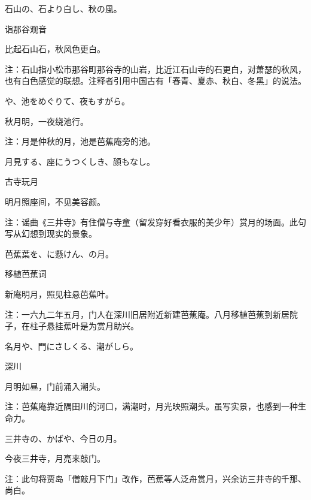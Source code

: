 \begin{haiku}
    {\FH 石山の、石より白し、秋の風。}

    {\FK 诣那谷观音}

    {\FK 比起石山石，秋风色更白。}

    {\FT 注：石山指小松市那谷町那谷寺的山岩，比近江石山寺的石更白，对萧瑟的秋风，也有白色感觉的联想。注释者引用中国古有「春青、夏赤、秋白、冬黑」的说法。}
\end{haiku}

\begin{haiku}
    {\FH {}や、池をめぐりて、夜もすがら。}

    {\FK 秋月明，一夜绕池行。}

    {\FT 注：月是仲秋的月，池是芭蕉庵旁的池。}
\end{haiku}

\begin{haiku}
    {\FH 月見する、座にうつくしき、顔もなし。}

    {\FK 古寺玩月}

    {\FK 明月照座间，不见美容颜。}

    {\FT 注：谣曲《三井寺》有住僧与寺童（留发穿好看衣服的美少年）赏月的场面。此句写从幻想到现实的景象。}
\end{haiku}

\begin{haiku}
    {\FH 芭蕉葉を、に懸けん、の月。}

    {\FK 移植芭蕉词}

    {\FK 新庵明月，照见柱悬芭蕉叶。}

    {\FT 注：一六九二年五月，门人在深川旧居附近新建芭蕉庵。八月移植芭蕉到新居院子，在柱子悬挂蕉叶是为赏月助兴。}
\end{haiku}

\begin{haiku}
    {\FH 名月や、門にさしくる、潮がしら。}

    {\FK 深川}

    {\FK 月明如昼，门前涌入潮头。}

    {\FT 注：芭蕉庵靠近隅田川的河口，满潮时，月光映照潮头。虽写实景，也感到一种生命力。}
\end{haiku}

\begin{haiku}
    {\FH 三井寺の、かばや、今日の月。}

    {\FK 今夜三井寺，月亮来敲门。}

    {\FT 注：此句将贾岛「僧敲月下门」改作，芭蕉等人泛舟赏月，兴余访三井寺的千那、尚白。}
\end{haiku}

